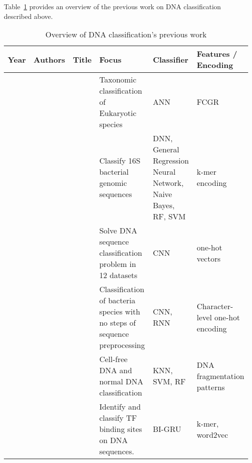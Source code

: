 Table~\ref{tab:previous_work} provides an overview of the previous work on DNA classification described above.


\begin{footnotesize}
\begin{longtable}{lp{1.5cm}p{3.3cm}p{3cm}p{2.2cm}p{2.7cm}}
    \caption{Overview of DNA classification's previous work}
	\label{tab:previous_work}
	\endfirsthead
    \endhead
	\toprule
	\textbf{Year} & \textbf{Authors} & \textbf{Title} & \textbf{Focus} & \textbf{Classifier} & \textbf{Features / Encoding}\\
	\midrule
	
	\citeyear{Nair2010ANNRepresentation} & \citeauthor{Nair2010ANNRepresentation} & \citetitle{Nair2010ANNRepresentation}~\cite{Nair2010ANNRepresentation} & Taxonomic classification of Eukaryotic species & \gls{ANN} & FCGR\\\midrule
	
	\citeyear{Rizzo2015AClassification} & \citeauthor{Rizzo2015AClassification} & \citetitle{Rizzo2015AClassification}~\cite{Rizzo2015AClassification} & Classify 16S bacterial genomic sequences & \gls{DNN}, General Regression Neural Network, Naive Bayes, \gls{RF}, \gls{SVM} & k-mer encoding\\\midrule
	
	\citeyear{Nguyen2016DNANetwork} & \citeauthor{Nguyen2016DNANetwork} & \citetitle{Nguyen2016DNANetwork}~\cite{Nguyen2016DNANetwork} & Solve DNA sequence classification problem in 12 datasets & \gls{CNN} & one-hot vectors\\\midrule
	
	\citeyear{LoBosco2017DeepClassification} & \citeauthor{LoBosco2017DeepClassification} & \citetitle{LoBosco2017DeepClassification}~\cite{LoBosco2017DeepClassification} & Classification of bacteria species with no steps of sequence preprocessing & \gls{CNN}, \gls{RNN} & Character-level one-hot encoding\\\midrule
	
	\citeyear{Chen2017AClassification} & \citeauthor{Chen2017AClassification} & \citetitle{Chen2017AClassification}~\cite{Chen2017AClassification} & Cell-free DNA and normal DNA classification & \gls{KNN}, \gls{SVM}, \gls{RF} & DNA fragmentation patterns\\\midrule
	
	\citeyear{Shen2018RecurrentSites} & \citeauthor{Shen2018RecurrentSites} & \citetitle{Shen2018RecurrentSites}~\cite{Helaly2019ConvolutionalStudy} & Identify and classify \gls{TF} binding sites on \gls{DNA} sequences. & BI-\gls{GRU} & k-mer, word2vec \\\midrule
	

\end{longtable}
\end{footnotesize}
